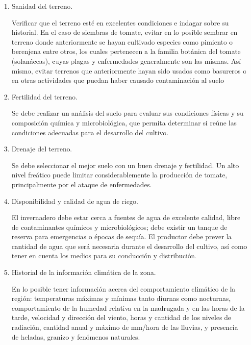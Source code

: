 \begin{enumerate}
    \item Sanidad del terreno.

        Verificar que el terreno esté en excelentes condiciones e indagar sobre
        su historial. En el caso de siembras de tomate, evitar en lo posible
        sembrar en terreno donde anteriormente se hayan cultivado especies como
        pimiento o berenjena entre otros, los cuales pertenecen a la familia
        botánica del tomate (solanáceas), cuyas plagas y enfermedades
        generalmente son las mismas. Así mismo, evitar terrenos que
        anteriormente hayan sido usados como basureros o en otras actividades
        que puedan haber causado contaminación al suelo
    \item Fertilidad del terreno. 

        Se debe realizar un análisis del suelo para evaluar sus condiciones
        físicas y su composición química y microbiológica, que permita
        determinar si reúne las condiciones adecuadas para el desarrollo del
        cultivo.
    \item Drenaje del terreno. 

        Se debe seleccionar el mejor suelo con un buen drenaje y fertilidad. Un
        alto nivel freático puede limitar considerablemente la producción de
        tomate, principalmente por el ataque de enfermedades.
    \item Disponibilidad y calidad de agua de riego. 

        El invernadero debe estar cerca a fuentes de agua de excelente calidad,
        libre de contaminantes químicos y microbiológicos; debe existir un
        tanque de reserva para emergencias o épocas de sequía. El productor
        debe prever la cantidad de agua que será necesaria durante el
        desarrollo del cultivo, así como tener en cuenta los medios para su
        conducción y distribución.
    \item Historial de la información climática de la zona.

        En lo posible tener información acerca del comportamiento climático de
        la región: temperaturas máximas y mínimas tanto diurnas como nocturnas,
        comportamiento de la humedad relativa en la madrugada y en las horas de
        la tarde, velocidad y dirección del viento, horas y cantidad de los
        niveles de radiación, cantidad anual y máximo de mm/hora de las
        lluvias, y presencia de heladas, granizo y fenómenos naturales.


\end{enumerate}
